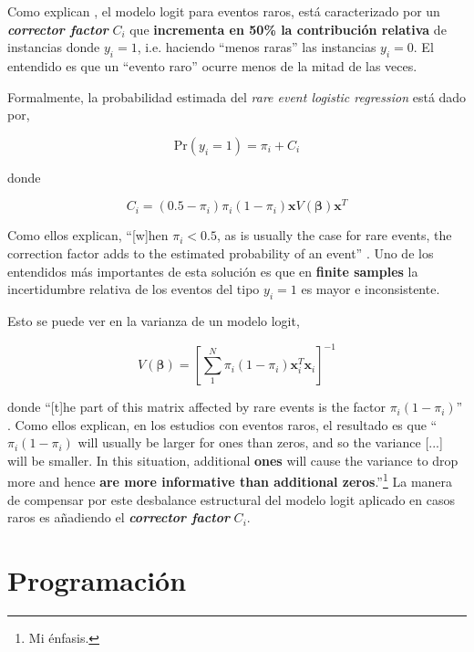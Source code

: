 \documentclass[onesided]{article}\usepackage[]{graphicx}\usepackage[]{color}
\begin{document}
Como explican \textcite[149]{King2001}, el modelo logit para eventos raros, est\'a caracterizado por un \emph{{\bf corrector factor}} $C_{i}$ que {\bf incrementa en 50\% la contribuci\'on relativa} de instancias donde $y_{i}=1$, i.e. haciendo ``menos raras'' las instancias $y_{i}=0$. El entendido es que un ``evento raro'' ocurre menos de la mitad de las veces. 

Formalmente, la probabilidad estimada del \emph{rare event logistic regression} est\'a dado por,

\begin{equation}\label{corrector:factor:1}
\text{Pr}(y_{i}=1)=\pi_{i} + C_{i}
\end{equation}

donde


\begin{equation}\label{corrector:factor:2}
C_{i} = (0.5-\pi_{i})\pi_{i}(1-\pi_{i})\boldsymbol{x}V(\boldsymbol{\beta})\boldsymbol{x}^{T}
\end{equation}

Como ellos explican, ``[w]hen $\pi_{i} < 0.5$, as is usually the case for rare events, the correction factor adds to the estimated probability of an event'' \parencite[149]{King2001}. Uno de los entendidos m\'as importantes de esta soluci\'on es que en {\bf finite samples} la incertidumbre relativa de los eventos del tipo $y_{i}=1$ es mayor e inconsistente. 

Esto se puede ver en la varianza de un modelo logit,

\begin{equation}\label{var:logit}
V(\boldsymbol{\beta}) = [\sum_{1}^{N}\pi_{i}(1-\pi_{i})\boldsymbol{x}_{i}^{T}\boldsymbol{x}_{i}]^{-1}
\end{equation}

donde ``[t]he part of this matrix affected by rare events is the factor $\pi_{i}(1-\pi_{i})$'' \parencite[141]{King2001}. Como ellos explican, en los estudios con eventos raros, el resultado es que ``$\pi_{i}(1-\pi_{i})$ will usually be larger for ones than zeros, and so the variance [...] will be smaller. In this situation, additional {\bf ones} will cause the variance to drop more and hence {\bf are more informative than additional zeros}.''\footnote{Mi \'enfasis.} La manera de compensar por este desbalance estructural del modelo logit aplicado en casos raros es a\~nadiendo el \emph{{\bf corrector factor}} $C_{i}$.


\section{Programaci\'on}
\end{document}
